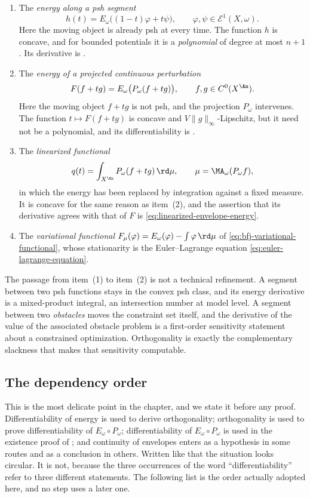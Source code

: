 \begin{enumerate}
\item
The \emph{energy along a psh segment}
\[
 h(t)=E_\omega\bigl((1-t)\varphi+t\psi\bigr),
 \qquad \varphi,\psi\in\mathcal E^1(X,\omega).
\]
Here the moving object is already psh at every time.  The function $h$ is
concave, and for bounded potentials it is a \emph{polynomial} of degree at
most $n+1$.  Its derivative is .
\item
The \emph{energy of a projected continuous perturbation}
\[
 F(f+tg)=E_\omega\bigl(P_\omega(f+tg)\bigr),
 \qquad f,g\in C^0(X^{\An}).
\]
Here the moving object $f+tg$ is not psh, and the projection $P_\omega$
intervenes.  The function $t\mapsto F(f+tg)$ is concave and
$V\lVert g\rVert_\infty$-Lipschitz, but it need not be a polynomial, and
its differentiability is .
\item
The \emph{linearized functional}
\[
 q(t)=\int_{X^{\An}}P_\omega(f+tg)\,\rd\mu,
 \qquad \mu=\MA_\omega(P_\omega f),
\]
in which the energy has been replaced by integration against a fixed
measure.  It is concave for the same reason as
item~(2), and the assertion that its derivative
agrees with that of $F$ is \eqref{eq:linearized-envelope-energy}.
\item
The \emph{variational functional}
$F_\mu(\varphi)=E_\omega(\varphi)-\int\varphi\,\rd\mu$ of
\eqref{eq:bfj-variational-functional}, whose stationarity is the
Euler--Lagrange equation \eqref{eq:euler-lagrange-equation}.
\end{enumerate}

The passage from item~(1) to
item~(2) is not a technical refinement.  A segment
between two psh functions stays in the convex psh class, and its energy
derivative is a mixed-product integral, an intersection number at model
level.  A segment between two \emph{obstacles} moves the
constraint set itself, and the derivative of the value of the associated
obstacle problem is a first-order sensitivity statement about a
constrained optimization.  Orthogonality is exactly the complementary
slackness that makes that sensitivity computable.

\subsection{The dependency order}
\label{sec:ch27-dependency}

This is the most delicate point in the chapter, and we state it before any
proof.  Differentiability of energy is used to derive orthogonality;
orthogonality is used to prove differentiability of $E_\omega\circ
P_\omega$; differentiability of $E_\omega\circ P_\omega$ is used in the
existence proof of ; and continuity of
envelopes enters as a hypothesis in some routes and as a conclusion in
others.  Written like that the situation looks circular.  It is not, because
the three occurrences of the word ``differentiability'' refer to three
different statements.  The following list is the order actually adopted
here, and no step uses a later one.

